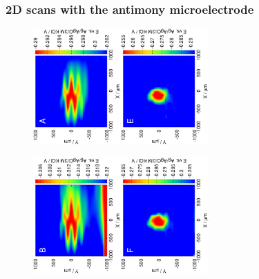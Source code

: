 	\subsubsection{2D scans with the antimony microelectrode}
\begin{figure}
\centering
\includegraphics[trim = 10mm 30mm 0mm 10mm, clip, width=0.3\textwidth, angle=-90]{img/pH_2D_Sb/13121313.eps}\includegraphics[trim = 10mm 30mm 0mm 10mm, clip, width=0.3\textwidth, angle=-90]{img/pH_2D_Sb/13121313_deconvoluted.eps}%

\includegraphics[trim = 10mm 30mm 0mm 10mm, clip, width=0.3\textwidth, angle=-90]{img/pH_2D_Sb/13121314.eps}\includegraphics[trim = 10mm 30mm 0mm 10mm, clip, width=0.3\textwidth, angle=-90]{img/pH_2D_Sb/13121314_deconvoluted.eps}


\end{figure}
